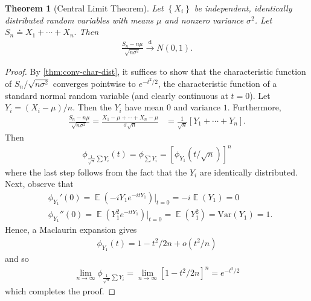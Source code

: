 \documentclass[12pt]{amsbook}
\DeclareMathOperator{\ex}{\mathbb{E}}
\newcommand{\var}{\mathrm{Var}}
\theoremstyle{plain}
\newtheorem{theorem}{Theorem}
\theoremstyle{definition}
\theoremstyle{remark}
\numberwithin{equation}{section}  %
\numberwithin{equation}{section}  %
\begin{document}
	\begin{theorem}[Central Limit Theorem]\label{thm:central-limit}
		Let $ \left\{ X_{i} \right\}$ be independent, identically
		distributed random variables with means $\mu$ and nonzero
		variance $\sigma^{2}$. Let $S_{n} \doteq X_{1} + \cdots + X_{n}.$ Then
		\begin{equation*}
			\begin{split}
				\frac{S_{n} - n \mu}{\sqrt{n \sigma^{2}}} \xrightarrow{\text{d}} N(0,1).
			\end{split}
		\end{equation*}
	\end{theorem}
	\begin{proof}
		By \cref{thm:conv-char-dist}, it suffices to show that
		the characteristic function of $S_{n}/\sqrt{n \sigma^{2}}$ converges
		pointwise to  $e^{-t^{2}/2}$, the characteristic function of 
		a standard normal random variable (and clearly
		continuous at $t=0$). Let
		$Y_{i} = (X_{i} - \mu)/n$. Then the $Y_{i}$ have mean $0$ and
		variance $1$. Furthermore, 
		\begin{equation*}
			\begin{split}
				\frac{S_{n} - n \mu}{\sqrt{n \sigma^{2}}}
				= \frac{X_{1} - \mu+ \cdots + X_{n} - \mu}{\sigma \sqrt{n}}
				& = \frac{1}{\sqrt{n}}\left[ Y_{1} + \cdots + Y_{n} \right].
			\end{split}
		\end{equation*}
		Then
		\begin{equation*}
			\begin{split}
				\phi_{\frac{1}{\sqrt{n}}\sum Y_{i}}(t)
				= \phi_{\sum Y_{i}} = \left[ \phi_{Y_{1}}\left( t/\sqrt{n} \right) \right]^{n}
			\end{split}
		\end{equation*}
		where the last step follows from the fact that the $Y_{i}$ are identically
		distributed. Next, observe that
		\begin{equation*}
			\begin{split}
				& \phi_{Y_{1}}'(0) = \ex (-iY_{1} e^{-itY_{1}}) \vert_{t = 0} = -i
				\ex(Y_{1}) = 0
				\\
				& \phi_{Y_{1}}''(0) = \ex(Y_{1}^{2} e^{-itY_{1}}) \vert_{t = 0} = 
				\ex(Y_{1}^{2}) = \var(Y_{1}) = 1.
			\end{split}
		\end{equation*}
		Hence, a Maclaurin expansion gives
		\begin{equation*}
			\begin{split}
				\phi_{Y_{1}}(t) = 1 - t^{2}/2n + o(t^{2}/n)
			\end{split}
		\end{equation*}
		and so
		\begin{equation*}
			\begin{split}
				\lim_{n \to \infty} \phi_{\frac{1}{\sqrt{n}} \sum Y_{i}}
				= \lim_{n \to \infty} \left[ 1 - t^{2}/2n \right]^{n}
				= e^{-t^{2}/2}
			\end{split}
		\end{equation*}
		which completes the proof.
	\end{proof}
\end{document}
